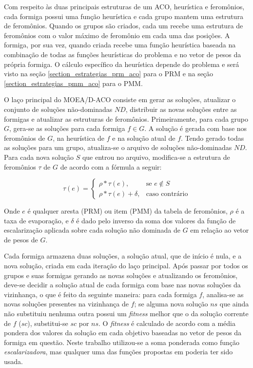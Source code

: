 Com respeito às duas principais estruturas de um ACO, heurística e feromônios, cada formiga possui uma função heurística e cada grupo mantem uma estrutura de feromônios. Quando os grupos são criados, cada um recebe uma estrutura de feromônios com o valor máximo de feromônio em cada uma das posições. A formiga, por sua vez, quando criada recebe uma função heurística baseada na combinação de todas as funções heurísticas do problema e no vetor de pesos da própria formiga. O cálculo específico da heurística depende do problema e será visto na seção \ref{section_estrategias_prm_aco} para o PRM e na seção \ref{section_estrategias_pmm_aco} para o PMM.

O laço principal do MOEA/D-ACO consiste em gerar as soluções, atualizar o conjunto de soluções não-dominadas $ND$, distribuir as novas soluções entre as formigas e atualizar as estruturas de feromônios. Primeiramente, para cada grupo $G$, gera-se as soluções para cada formiga $f \in G$. A solução é gerada com base nos feromônios de $G$, na heurística de $f$ e na solução atual de $f$. Tendo gerado todas as soluções para um grupo, atualiza-se o arquivo de soluções não-dominadas $ND$. Para cada nova solução $S$ que entrou no arquivo, modifica-se a estrutura de feromônios $\tau$ de $G$ de acordo com a fórmula a seguir:

\[
\tau(e)= 
\begin{cases}
\rho * \tau(e),& \text{se } e \notin S\\
\rho * \tau(e) + \delta,              & \text{caso contrário}
\end{cases}
\]

Onde $e$ é qualquer aresta (PRM) ou item (PMM) da tabela de feromônios, $\rho$ é a taxa de evaporação, e $\delta$ é dado pelo inverso da soma dos valores da função de escalarização aplicada sobre cada solução não dominada de $G$ em relação ao vetor de pesos de $G$.

Cada formiga armazena duas soluções, a solução atual, que de início é nula, e a nova solução, criada em cada iteração do laço principal. Após passar por todos os grupos e suas formigas gerando as novas soluções e atualizando os feromônios, deve-se decidir a solução atual de cada formiga com base nas novas soluções da vizinhança, o que é feito da seguinte maneira: para cada formiga $f$, analisa-se as novas soluções presentes na vizinhança de $f$; se alguma nova solução $ns$ que ainda não substituiu nenhuma outra possui um \textit{fitness} melhor que o da solução corrente de $f$ ($sc$), substitui-se $sc$ por $ns$. O \textit{fitness} é calculado de acordo com a média pondera dos valores da solução em cada objetivo baseadas no vetor de pesos da formiga em questão. Neste trabalho utilizou-se a soma ponderada como função \textit{escalarizadora}, mas qualquer uma das funções propostas em \cite{Zhang2007} poderia ter sido usada.

